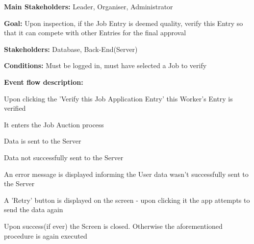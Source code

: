 			\noindent {}
			\begin{packed_item}
				\item \textbf{Main Stakeholders:} Leader, Organiser, Administrator
				\item \textbf{Goal:} Upon inspection, if the Job Entry is deemed quality, verify this Entry so that it can compete with other Entries for the final approval
				\item \textbf{Stakeholders: } Database, Back-End(Server)
				\item \textbf{Conditions: } Must be logged in, must have selected a Job to verify
				\item \textbf{Event flow description: }
				\begin{packed_enum}
					\item Upon clicking the 'Verify this Job Application Entry' this Worker's Entry is verified
					\item It enters the Job Auction process
					\item Data is sent to the Server
				\end{packed_enum}
				
				\begin{packed_item}
					\item[3.a] Data not successfully sent to the Server
					\item[] \begin{packed_enum}
						\item An error message is displayed informing the User data wasn't successfully sent to the Server
						\item A 'Retry' button is displayed on the screen - upon clicking it the app attempts to send the data again
						\item Upon success(if ever) the Screen is closed. Otherwise the aforementioned procedure is again executed
					\end{packed_enum}
				\end{packed_item}
			\end{packed_item}

